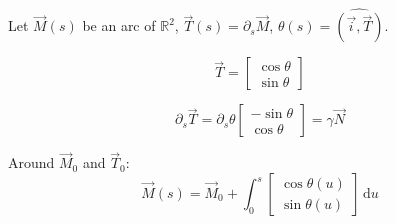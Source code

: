 \documentclass[aps,12pt]{revtex4}
\begin{document}
Let  $\vec{M}(s)$ be an arc of $\mathbb{R}^2$,  $\vec{T}(s) = \partial_s \vec{M}$, $\theta(s) = \widehat{(\vec{i},\vec{T})}$.

\begin{equation}
	\vec{T} = 
	\begin{bmatrix}
	\cos \theta\\
	\sin \theta
	\end{bmatrix}
\end{equation}

\begin{equation}
	\partial_s \vec{T} = \partial_s \theta 
	\begin{bmatrix}
	-\sin\theta\\
	\cos \theta
	\end{bmatrix}
 = \gamma \vec{N}
\end{equation}

Around $\vec{M}_0$ and $\vec{T}_0$:
\begin{equation}
	\vec{M}(s) = \vec{M}_0 + \int_0^s \begin{bmatrix}
	\cos \theta(u)\\
	\sin \theta(u)
	\end{bmatrix}
	\, \mathrm{d}u
\end{equation}
\end{document}
